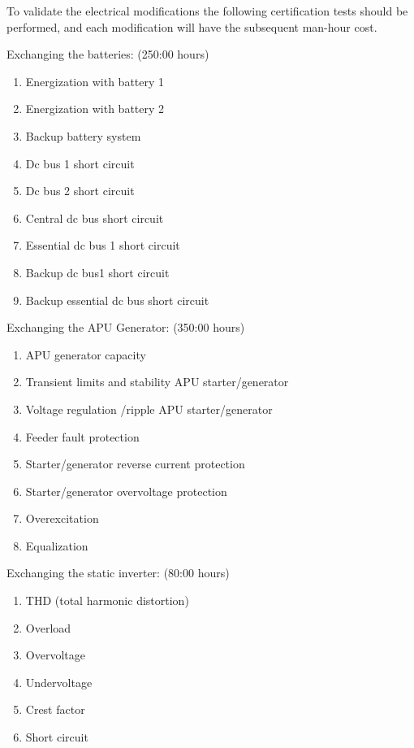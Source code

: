 To validate the electrical modifications the following certification tests should be performed, and each modification will have the subsequent man-hour cost.

Exchanging the batteries: (250:00 hours)

\begin{enumerate}
    \item Energization with battery 1
    \item Energization with battery 2
    \item Backup battery system
    \item Dc bus 1 short circuit
    \item Dc bus 2 short circuit
    \item Central dc bus short circuit
    \item Essential dc bus 1 short circuit
    \item Backup dc bus1 short circuit
    \item Backup essential dc bus short circuit
\end{enumerate}

Exchanging the APU Generator: (350:00 hours)	

\begin{enumerate}
\item APU generator capacity
\item Transient limits and stability APU starter/generator
\item Voltage regulation /ripple APU starter/generator
\item Feeder fault protection
\item Starter/generator reverse current protection
\item Starter/generator overvoltage protection
\item Overexcitation
\item Equalization
\end{enumerate}

Exchanging the static inverter: (80:00 hours)


\begin{enumerate}
 \item THD (total harmonic distortion)
\item Overload
\item Overvoltage
\item Undervoltage
\item Crest factor
\item Short circuit
\end{enumerate}

